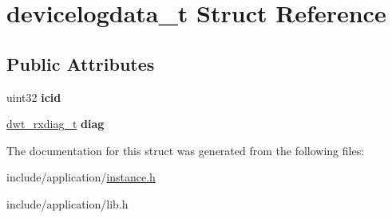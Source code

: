 \hypertarget{structdevicelogdata__t}{\section{devicelogdata\-\_\-t Struct Reference}
\label{structdevicelogdata__t}
}
\subsection*{Public Attributes}
\begin{DoxyCompactItemize}
\item 
\hypertarget{structdevicelogdata__t_a40471bfaa8041130270b1abb3367ec47}{uint32 {\bfseries icid}}\label{structdevicelogdata__t_a40471bfaa8041130270b1abb3367ec47}

\item 
\hypertarget{structdevicelogdata__t_a1316e3c6e9ae8d81c8979c976363ab5e}{\hyperlink{structdwt__rxdiag__t}{dwt\-\_\-rxdiag\-\_\-t} {\bfseries diag}}\label{structdevicelogdata__t_a1316e3c6e9ae8d81c8979c976363ab5e}

\end{DoxyCompactItemize}


The documentation for this struct was generated from the following files\-:\begin{DoxyCompactItemize}
\item 
include/application/\hyperlink{instance_8h}{instance.\-h}\item 
include/application/lib.\-h\end{DoxyCompactItemize}
